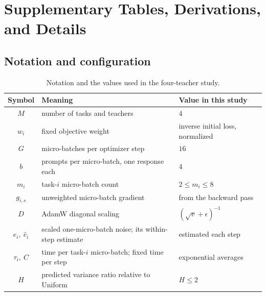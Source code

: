 \section{Supplementary Tables, Derivations, and Details}

\subsection{Notation and configuration}
\label{app:reference_tables}

\begin{table}[H]
\centering
\small
\caption{Notation and the values used in the four-teacher study.}
\label{tab:notation}
\begin{tabular}{cll}
\toprule
Symbol & Meaning & Value in this study \\
\midrule
$M$ & number of tasks and teachers & $4$ \\
$w_i$ & fixed objective weight & inverse initial loss, normalized \\
$G$ & micro-batches per optimizer step & $16$ \\
$b$ & prompts per micro-batch, one response each & $4$ \\
$m_i$ & task-$i$ micro-batch count & $2\leq m_i\leq8$ \\
$g_{i,s}$ & unweighted micro-batch gradient & from the backward pass \\
$D$ & AdamW diagonal scaling & $(\sqrt v+\epsilon)^{-1}$ \\
$e_i,\ \widehat e_i$ & scaled one-micro-batch noise; its within-step estimate & estimated each step \\
$\tau_i,\ C$ & time per task-$i$ micro-batch; fixed time per step & exponential averages \\
$H$ & predicted variance ratio relative to Uniform & $H\leq2$ \\
\bottomrule
\end{tabular}
\end{table}

